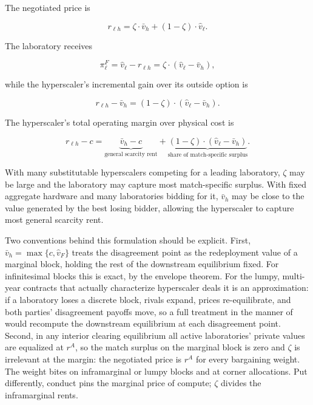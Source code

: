 \documentclass[11pt]{article}
\begin{document}
The negotiated price is

\begin{equation}r_{\ell h}=\zeta\cdot\bar v_h+\left(1-\zeta\right)\cdot\widehat v_\ell.\end{equation}

The laboratory receives

\begin{equation}\pi_\ell^F=\widehat v_\ell-r_{\ell h}=\zeta\cdot\left(\widehat v_\ell-\bar v_h\right),\end{equation}

while the hyperscaler's incremental gain over its outside option is

\begin{equation}r_{\ell h}-\bar v_h=\left(1-\zeta\right)\cdot\left(\widehat v_\ell-\bar v_h\right).\end{equation}

The hyperscaler's total operating margin over physical cost is

\begin{equation}r_{\ell h}-c=\underbrace{\bar v_h-c}_{\text{general scarcity rent}}+\underbrace{\left(1-\zeta\right)\cdot\left(\widehat v_\ell-\bar v_h\right)}_{\text{share of match-specific surplus}}.\end{equation}

With many substitutable hyperscalers competing for a leading laboratory, $\zeta$ may be large and the laboratory may capture most match-specific surplus. With fixed aggregate hardware and many laboratories bidding for it, $\bar v_h$ may be close to the value generated by the best losing bidder, allowing the hyperscaler to capture most general scarcity rent.

Two conventions behind this formulation should be explicit. First, $\bar v_h=\max\{c,\widehat v_F\}$ treats the disagreement point as the redeployment value of a marginal block, holding the rest of the downstream equilibrium fixed. For infinitesimal blocks this is exact, by the envelope theorem. For the lumpy, multi-year contracts that actually characterize hyperscaler deals it is an approximation: if a laboratory loses a discrete block, rivals expand, prices re-equilibrate, and both parties' disagreement payoffs move, so a full treatment in the manner of \citet{hornWolinsky1988} would recompute the downstream equilibrium at each disagreement point. Second, in any interior clearing equilibrium all active laboratories' private values are equalized at $r^A$, so the match surplus on the marginal block is zero and $\zeta$ is irrelevant at the margin: the negotiated price is $r^A$ for every bargaining weight. The weight bites on inframarginal or lumpy blocks and at corner allocations. Put differently, conduct pins the marginal price of compute; $\zeta$ divides the inframarginal rents.
\end{document}

